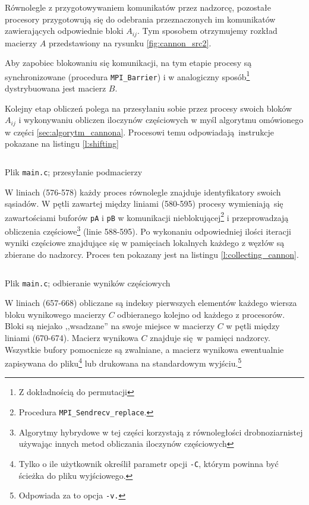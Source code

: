 Równolegle z przygotowywaniem komunikatów przez nadzorcę, pozostałe procesory przygotowują się do odebrania przeznaczonych im komunikatów zawierających odpowiednie bloki \(A_{ij}\). Tym sposobem otrzymujemy rozkład macierzy \(A\) przedstawiony na rysunku \ref{fig:cannon_src2}. 

Aby zapobiec blokowaniu się komunikacji, na tym etapie procesy są synchronizowane (procedura \texttt{MPI\_Barrier}) i w analogiczny sposób\footnote{Z dokładnością do permutacji} dystrybuowana jest macierz \(B\).

Kolejny etap obliczeń polega na przesyłaniu sobie przez procesy swoich bloków \(A_{ij}\) i wykonywaniu obliczen iloczynów częściowych w myśl algorytmu omówionego w części \ref{sec:algorytm_cannona}. Procesowi temu odpowiadają instrukcje pokazane na listingu \ref{l:shifting}

\begin{listing}[H]
\inputminted[fontsize=\footnotesize,bgcolor=bg,linenos,firstnumber=576,firstline=576,lastline=595]{c}{includes/listings/main.c}
\caption{Plik \texttt{main.c}; przesyłanie podmacierzy}
\label{l:shifting}
\end{listing}

W liniach (576-578) każdy proces równolegle znajduje identyfikatory swoich sąsiadów. W pętli zawartej między liniami (580-595) procesy wymieniają się zawartościami buforów \texttt{pA} i \texttt{pB} w komunikacji nieblokującej\footnote{Procedura \texttt{MPI\_Sendrecv\_replace}.} i przeprowadzają obliczenia częściowe\footnote{Algorytmy hybrydowe w tej części korzystają z równoległości drobnoziarnistej używając innych metod obliczania iloczynów częściowych} (linie 588-595). Po wykonaniu odpowiedniej ilości iteracji wyniki częściowe znajdujące się w pamięciach lokalnych każdego z węzłów są zbierane do nadzorcy. Proces ten pokazany jest na listingu \ref{l:collecting_cannon}.

\begin{listing}[H]
\inputminted[fontsize=\footnotesize,bgcolor=bg,linenos,firstnumber=644,firstline=644,lastline=679]{c}{includes/listings/main.c}
\caption{Plik \texttt{main.c}; odbieranie wyników częściowych}
\label{l:collecting_cannon}
\end{listing}

W liniach (657-668) obliczane są indeksy pierwszych elementów każdego wiersza bloku wynikowego macierzy \(C\) odbieranego kolejno od każdego z procesorów. Bloki są niejako ,,wsadzane'' na swoje miejsce w macierzy \(C\) w pętli między liniami (670-674). Macierz wynikowa \(C\) znajduje się w pamięci nadzorcy. Wszystkie bufory pomocnicze są zwalniane, a macierz wynikowa ewentualnie zapisywana do pliku\footnote{Tylko o ile użytkownik określił parametr opcji \texttt{-C}, którym powinna być ścieżka do pliku wyjściowego.} lub drukowana na standardowym wyjściu.\footnote{Odpowiada za to opcja \texttt{-v.}}

